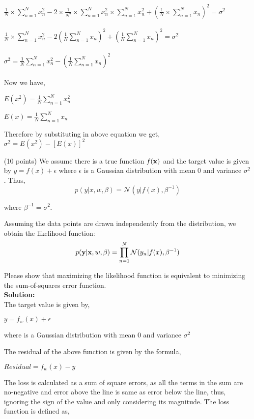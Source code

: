 \documentclass{exam}
\newcommand{\xx}{{\bf{x}}}
\begin{document}
\begin{questions}
$\frac{1}{N} \times\sum_{n=1}^{N}x_{n}^2 - 2 \times \frac{1}{N^2}\times \sum_{n=1}^{N}x_{n}^2 \times \sum_{n=1}^{N}x_{n}^2 + (\frac{1}{N}\times \sum_{n=1}^{N}x_{n})^2=\sigma^2$\\\\

$\frac{1}{N} \times\sum_{n=1}^{N}x_{n}^2 - 2(\frac{1}{N} \sum_{n=1}^{N}x_{n})^2 + (\frac{1}{N}\sum_{n=1}^{N}x_{n})^2 = \sigma^2$\\\\

$\sigma^2 = \frac{1}{N}\sum_{n=1}^{N}x_{n}^2 - (\frac{1}{N} \sum_{n=1}^{N}x_{n})^2$\\\\
Now we have,

$E(x^{2}) =  \frac{1}{N}\sum_{n=1}^{N}x_{n}^2$

$E(x) =  \frac{1}{N}\sum_{n=1}^{N}x_{n}$

Therefore by substituting in above equation we get,\\

$\sigma^2 = E(x^{2}) - [E(x)]^{2}$


\newpage
{} (10 points) We assume there is a true function $f(\xx)$ and the target value is given by $y=f(x)+\epsilon$ where $\epsilon$ is a Gaussian distribution with mean $0$ and variance $\sigma^2$.
Thus,
$$p(y|x,w,\beta) =\mathcal{N}(y| f(x), \beta^{-1})$$

where $\beta^{-1} = \sigma^2$.

Assuming the data points are drawn independently from the distribution, we obtain the likelihood function:
$$p(\mathbf{y}|\xx,w,\beta) = \prod_{n=1}^N \mathcal{N}(y_n|f(x),\beta^{-1})$$

Please show that maximizing the likelihood function is equivalent to minimizing the sum-of-squares error function.\\
\textbf{Solution:}\\
The target value is given by,

$y=f_{w}(x) + \epsilon$

where \epsilon is a Gaussian distribution with mean 0 and variance $\sigma^2$

The residual of the above function is given by the formula,

$Residual = f_{w}(x)-y$

The loss is calculated as a sum of square errors, as all the terms in the sum are no-negative and error above the line is same as error below the line, thus, ignoring the sign of the value and only considering its magnitude.
The loss function is defined as,


\end{questions}
\end{document}

